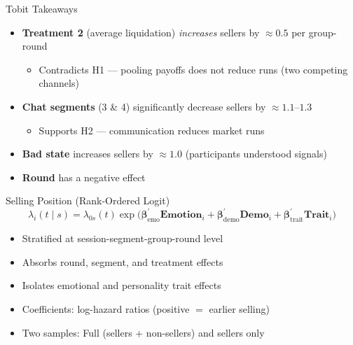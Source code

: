 \documentclass{beamer}
\begin{document}
\begin{frame}{Tobit Takeaways}
\begin{itemize}
    \item \textbf{Treatment 2} (average liquidation) \textit{increases} sellers by $\approx 0.5$ per group-round 
    \begin{itemize}
        \item Contradicts H1 --- pooling payoffs does not reduce runs (two competing channels)
    \end{itemize}
    \item \textbf{Chat segments} (3 \& 4) significantly decrease sellers by $\approx 1.1$--$1.3$
    \begin{itemize}
        \item Supports H2 --- communication reduces market runs
    \end{itemize}
    \item \textbf{Bad state} increases sellers by $\approx 1.0$ (participants understood signals)
    \item \textbf{Round} has a negative effect
\end{itemize}
\end{frame}


\begin{frame}{Selling Position (Rank-Ordered Logit)}
\vspace{-0.2cm}
\begin{equation*}
    \lambda_i(t \mid s) = \lambda_{0s}(t) \exp\bigl(
    \boldsymbol{\beta}_{\text{emo}}^{\prime} \mathbf{Emotion}_i + \boldsymbol{\beta}_{\text{demo}}^{\prime} \mathbf{Demo}_i
     + \boldsymbol{\beta}_{\text{trait}}^{\prime} \mathbf{Trait}_i \bigr)
\end{equation*}

\begin{itemize}
    \item Stratified at session-segment-group-round level
    \item Absorbs round, segment, and treatment effects
    \item Isolates emotional and personality trait effects
    \item Coefficients: log-hazard ratios (positive $=$ earlier selling)
    \item Two samples: Full (sellers + non-sellers) and sellers only
\end{itemize}
\end{frame}
\end{document}
